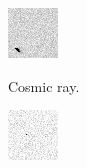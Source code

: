 \begin{figure}[!h]
    \begin{subfigure}{.2\textwidth}
        \centering
        \includegraphics[width=\textwidth]{images/cosmicray.png}
        \label{fig:fitsreal3d}
        \caption{Cosmic ray.}
    \end{subfigure}
    \begin{subfigure}{.2\textwidth}
        \centering
        \includegraphics[width=\textwidth]{images/hotpixel.png}

\end{subfigure}
\end{figure}
